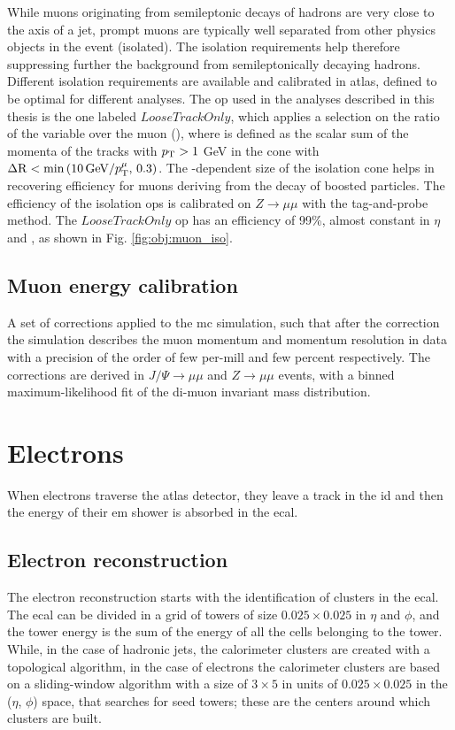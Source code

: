 While muons originating from semileptonic decays of hadrons are very close to the axis of a jet, prompt muons are typically well separated from other physics objects in the event (isolated). The isolation requirements help therefore suppressing further the background from semileptonically decaying hadrons. Different isolation requirements are available and calibrated in \gls{atlas}, defined to be optimal for different analyses. 
The \gls{op} used in the analyses described in this thesis is the one labeled $LooseTrackOnly$, which applies a selection on the ratio of the 
variable \ptvar over the muon \pt (\ptmu), where \ptvar is defined as the scalar sum of the momenta of the tracks with $p_{\rm T}>1$ GeV in the cone with 
$\Delta\mathrm{R} < \min \left(  10 \, \mathrm{GeV}/p_\mathrm{T}^\mu , \, 0.3\right) $. The \pt-dependent size of the isolation cone helps in recovering efficiency for muons deriving from the decay of boosted particles. The efficiency of the isolation \glspl{op} is calibrated on $Z\rightarrow \mu \mu$ with the tag-and-probe method. The $LooseTrackOnly$ \gls{op} has an efficiency of 99\%, almost constant in $\eta$ and \pt, as shown in Fig. \ref{fig:obj:muon_iso}. 

\subsection{Muon energy calibration}
A set of corrections applied to the \gls{mc} simulation, such that after the correction the simulation describes the muon momentum and momentum resolution in data with a precision of the order of few per-mill and few percent respectively. 
The corrections are derived in $J/\Psi \rightarrow \mu \mu$ and $Z\rightarrow \mu \mu$ events, with a binned maximum-likelihood fit of the di-muon 
invariant mass distribution. 

\section{Electrons}

When electrons traverse the \gls{atlas} detector, they leave a track in the \gls{id} and then the energy of their \gls{em} shower is absorbed in the \gls{ecal}.

\subsection{Electron reconstruction}

The electron reconstruction \cite{ATLAS:2011lah,Aad:2014nim,ATLAS:2016iqc} starts with the identification of clusters in the \gls{ecal}. 
The \gls{ecal} can be divided in a grid of towers of size $0.025\times0.025$ in $\eta$ and $\phi$, and the tower energy is the sum of the 
energy of all the cells belonging to the tower. 
While, in the case of hadronic jets, the calorimeter clusters are created with a topological 
algorithm, in the case of electrons the calorimeter clusters are based on a sliding-window algorithm \cite{Lampl:2008zz} 
with a size of $3\times5$ in units of $0.025\times0.025$ in the ($\eta$, $\phi$) space, that searches for seed towers; these are the centers around which clusters are built.   

